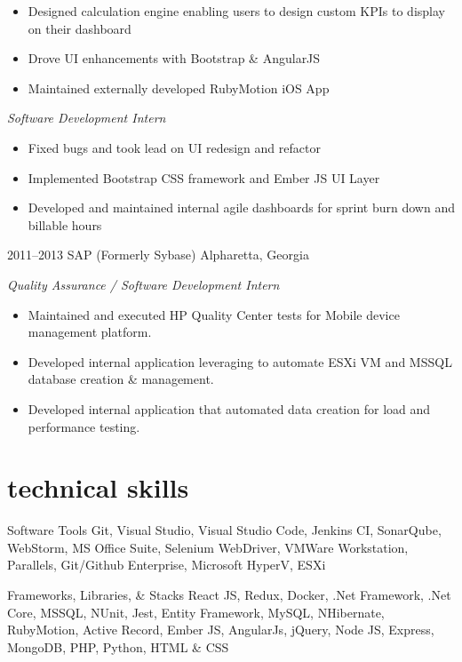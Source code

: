 \documentclass[]{friggeri-cv} %
\begin{document}
\begin{entrylist}
{\begin{itemize}
    \item Designed calculation engine enabling users to design custom KPIs to display on their dashboard
    \item Drove UI enhancements with Bootstrap \& AngularJS
    \item Maintained externally developed RubyMotion iOS App
  \end{itemize}
  \emph{Software Development Intern}
  \begin{itemize}
    \item Fixed bugs and took lead on UI redesign and refactor
    \item Implemented Bootstrap CSS framework and Ember JS UI Layer
    \item Developed and maintained internal agile dashboards for sprint burn down and billable hours
  \end{itemize}
}
\entry
{2011--2013}
{SAP (Formerly Sybase)}
{Alpharetta, Georgia}
{\raggedright
  \emph{Quality Assurance / Software Development Intern}
  \begin{itemize}
    \item Maintained and executed HP Quality Center tests for Mobile device management platform.
    \item Developed internal application leveraging to automate ESXi VM and MSSQL database creation \& management.
    \item Developed internal application that automated data creation for load and performance testing. 
  \end{itemize}
}

\end{entrylist}

\pagebreak


\section{technical skills}
\begin{entrylist}
\entry
{}
{Software Tools}
{}
{Git, Visual Studio, Visual Studio Code, Jenkins CI, SonarQube, WebStorm, MS Office Suite, 
Selenium WebDriver, VMWare Workstation, Parallels, Git/Github Enterprise, Microsoft HyperV, ESXi}

\entry
{}
{Frameworks, Libraries, \& Stacks}
{}
{React JS, Redux, Docker, .Net Framework, .Net Core, MSSQL, NUnit, Jest, Entity Framework, MySQL, NHibernate, 
RubyMotion, Active Record, Ember JS, AngularJs, jQuery, Node JS, Express, MongoDB, PHP, Python, HTML \& CSS}
\end{entrylist}
\end{document}
